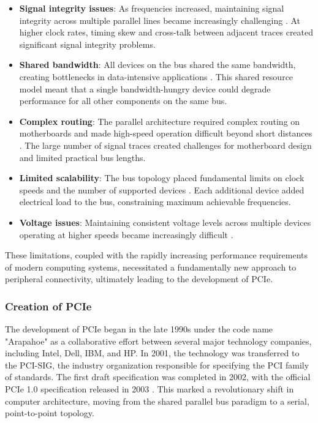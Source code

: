 \begin{itemize}
    \item \textbf{Signal integrity issues}: As frequencies increased, maintaining signal 
    integrity across multiple parallel lines became increasingly challenging 
    \parencite{wilen2003understanding}. At higher clock rates, 
    timing skew and cross-talk between adjacent traces created significant signal integrity problems.
    
    \item \textbf{Shared bandwidth}: All devices on the bus shared the same bandwidth, 
    creating bottlenecks in data-intensive applications 
    \parencite{budruk2003pci}. This shared resource model meant 
    that a single bandwidth-hungry device could degrade performance for all 
    other components on the same bus.
    
    \item \textbf{Complex routing}: The parallel architecture required complex 
    routing on motherboards and made high-speed operation difficult beyond 
    short distances \parencite{budruk2003pci}. The large number 
    of signal traces created challenges for motherboard design and limited 
    practical bus lengths.
    
    \item \textbf{Limited scalability}: The bus topology placed fundamental 
    limits on clock speeds and the number of supported devices 
    \parencite{anderson1999pci}. Each additional device added 
    electrical load to the bus, constraining maximum achievable frequencies.
    
    \item \textbf{Voltage issues}: Maintaining consistent voltage levels 
    across multiple devices operating at higher speeds became increasingly 
    difficult \parencite[pp.~112-115]{abbott2003pci}.
\end{itemize}

These limitations, coupled with the rapidly increasing performance requirements of 
modern computing systems, necessitated a fundamentally new approach to peripheral 
connectivity, ultimately leading to the development of \ac{PCIe}.

\subsubsection{Creation of PCIe}
\label{subsubsec:pcie_creation}

The development of \ac{PCIe} began in the late 1990s under the code name 
"Arapahoe" as a collaborative effort between several major technology companies, 
including Intel, Dell, IBM, and HP. In 2001, the technology was transferred to the \ac{PCI-SIG}, 
the industry organization responsible for specifying the \ac{PCI} 
family of standards. The first draft specification was completed in 2002, 
with the official \ac{PCIe} 1.0 specification released in 2003 
\parencite{pcisig2003}. This marked a revolutionary shift in computer 
architecture, moving from the shared parallel bus paradigm to a serial, 
point-to-point topology.

